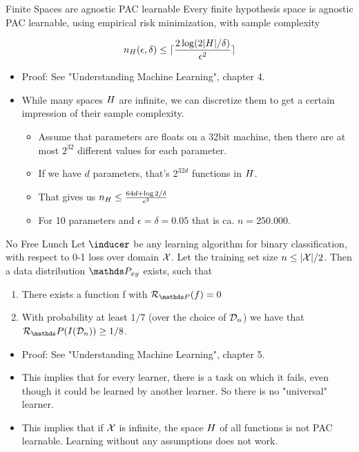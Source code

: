 \begin{vbframe}{Finite Spaces are agnostic PAC learnable}
Every finite hypothesis space is agnostic PAC learnable, using empirical risk minimization, with sample complexity

  $$ n_H(\epsilon, \delta) \leq \lceil \frac{2 \log (2|H| / \delta)}{\epsilon^2} \rceil$$ 

\begin{itemize}
  \item Proof: See "Understanding Machine Learning", chapter 4.
  \item While many spaces $H$ are infinite, we can discretize them to get a certain impression of their sample complexity.
\begin{itemize}
  \item Assume that parameters are floats on a 32bit machine, then there are at most $2^{32}$ different values for each parameter.
  \item If we have $d$ parameters, that's $2^{32d}$ functions in $H$.
  \item That gives us $n_H \leq \frac{64d + \log{2/\delta}}{\epsilon^2}$
  \item For 10 parameters and $\epsilon = \delta = 0.05$ that is ca. $n = 250.000$.
\end{itemize}
\end{itemize}

\end{vbframe}

\begin{vbframe}{No Free Lunch}
Let $\inducer$ be any learning algorithm for binary classification, with respect to 0-1 loss over domain $\mathcal{X}$. Let the training set size $n \leq |\mathcal{X}|/2$. Then a data distribution $\Pxy$ exists, such that

\begin{enumerate}
  \item There exists a function f with $\risk_{\P}(f) = 0$
  \item With probability at least $1/7$ (over the choice of $\mathcal{D}_n$) we have that $\risk_\P(I(\D_n)) \geq 1/8$.
\end{enumerate}

\lz

\begin{itemize}
  \item Proof: See "Understanding Machine Learning", chapter 5.
  \item This implies that for every learner, there is a task on which it fails, even though it could be learned by another learner. So there is no "universal" learner.
  \item This implies that if $\mathcal{X}$ is infinite, the space $H$ of all functions is not PAC learnable. Learning without any assumptions does not work.
\end{itemize}

\end{vbframe}


